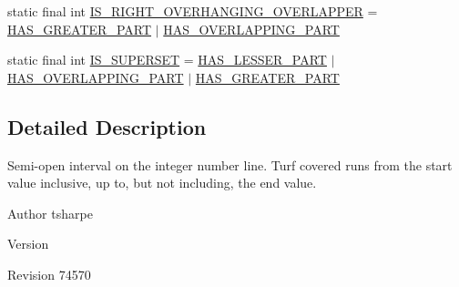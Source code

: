 \begin{DoxyCompactItemize}
\item 
static final int \hyperlink{interfacebroad_1_1core_1_1datastructures_1_1_interval_ab67c614b8b6be7c693a963d5ca67f6f6}{I\+S\+\_\+\+R\+I\+G\+H\+T\+\_\+\+O\+V\+E\+R\+H\+A\+N\+G\+I\+N\+G\+\_\+\+O\+V\+E\+R\+L\+A\+P\+P\+E\+R} = \hyperlink{interfacebroad_1_1core_1_1datastructures_1_1_interval_a82e90efccf2c08433e7400a6ea6e18d7}{H\+A\+S\+\_\+\+G\+R\+E\+A\+T\+E\+R\+\_\+\+P\+A\+R\+T} $\vert$ \hyperlink{interfacebroad_1_1core_1_1datastructures_1_1_interval_aa48e3d4d08f9fb5f5a3b866dd0e0f2ff}{H\+A\+S\+\_\+\+O\+V\+E\+R\+L\+A\+P\+P\+I\+N\+G\+\_\+\+P\+A\+R\+T}
\item 
static final int \hyperlink{interfacebroad_1_1core_1_1datastructures_1_1_interval_aa24dfd48992d1f74f751a7b2922f0eed}{I\+S\+\_\+\+S\+U\+P\+E\+R\+S\+E\+T} = \hyperlink{interfacebroad_1_1core_1_1datastructures_1_1_interval_a90a558c278b555b5331371115835085e}{H\+A\+S\+\_\+\+L\+E\+S\+S\+E\+R\+\_\+\+P\+A\+R\+T} $\vert$ \hyperlink{interfacebroad_1_1core_1_1datastructures_1_1_interval_aa48e3d4d08f9fb5f5a3b866dd0e0f2ff}{H\+A\+S\+\_\+\+O\+V\+E\+R\+L\+A\+P\+P\+I\+N\+G\+\_\+\+P\+A\+R\+T} $\vert$ \hyperlink{interfacebroad_1_1core_1_1datastructures_1_1_interval_a82e90efccf2c08433e7400a6ea6e18d7}{H\+A\+S\+\_\+\+G\+R\+E\+A\+T\+E\+R\+\_\+\+P\+A\+R\+T}
\end{DoxyCompactItemize}


\subsection{Detailed Description}
Semi-\/open interval on the integer number line. Turf covered runs from the start value inclusive, up to, but not including, the end value.

\begin{DoxyAuthor}{Author}
tsharpe 
\end{DoxyAuthor}
\begin{DoxyVersion}{Version}

\end{DoxyVersion}
\begin{DoxyParagraph}{Revision}
74570 
\end{DoxyParagraph}


